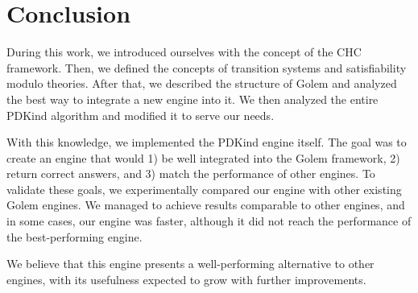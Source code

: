 \chapter{Conclusion}
During this work, we introduced ourselves with the concept of the CHC framework. Then, we defined the concepts of transition systems and satisfiability modulo theories. After that, we described the structure of Golem and analyzed the best way to integrate a new engine into it. We then analyzed the entire PDKind algorithm and modified it to serve our needs.

With this knowledge, we implemented the PDKind engine itself. The goal was to create an engine that would 1) be well integrated into the Golem framework, 2) return correct answers, and 3) match the performance of other engines. To validate these goals, we experimentally compared our engine with other existing Golem engines. We managed to achieve results comparable to other engines, and in some cases, our engine was faster, although it did not reach the performance of the best-performing engine.

We believe that this engine presents a well-performing alternative to other engines, with its usefulness expected to grow with further improvements.
